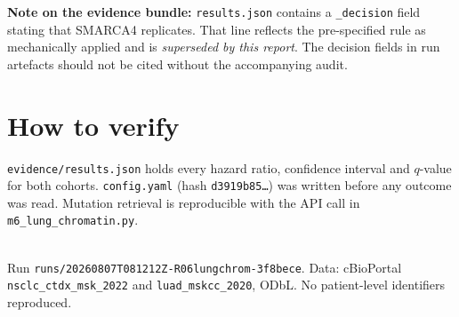 \documentclass[11pt,a4paper]{article}
\begin{document}
\noindent
\textbf{Note on the evidence bundle:} \texttt{results.json} contains a
\texttt{\_decision} field stating that SMARCA4 replicates. That line reflects the
pre-specified rule as mechanically applied and is \emph{superseded by this report}. The
decision fields in run artefacts should not be cited without the accompanying audit.

\section{How to verify}

\texttt{evidence/results.json} holds every hazard ratio, confidence interval and $q$-value
for both cohorts. \texttt{config.yaml} (hash \texttt{d3919b85\ldots}) was written before any
outcome was read. Mutation retrieval is reproducible with the API call in
\texttt{m6\_lung\_chromatin.py}.

\vfill
\noindent{\color{qgrey}\rule{\textwidth}{0.4pt}}\\
{\footnotesize\color{qgrey}Run \texttt{runs/20260807T081212Z-R06lungchrom-3f8bece}. Data:
cBioPortal \texttt{nsclc\_ctdx\_msk\_2022} and \texttt{luad\_mskcc\_2020}, ODbL. No
patient-level identifiers reproduced.}
\end{document}
